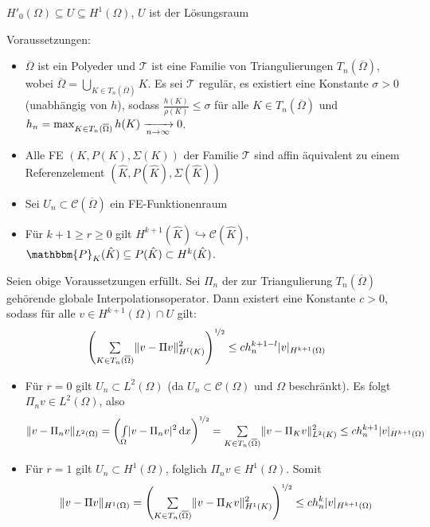 \documentclass{cheat-sheet}
\newcommand{\Cont}{\mathcal{C}} %
\newcommand{\clos}[1]{\overline{#1}} %
\newcommand{\cOmega}{\clos{\Omega}} %
\newcommand{\IntOmega}[2]{\AInt{\Omega}{#1}{#2}} %
\newcommand{\Poly}{\mathbbm{P}} %
\begin{document}

$H'_0(\Omega) \subseteq U \subseteq H^1(\Omega)$, $U$ ist der Lösungsraum

Voraussetzungen:

\begin{itemize}
  \item $\cOmega$ ist ein Polyeder und $\mathcal{T}$ ist eine Familie von Triangulierungen $T_n(\cOmega)$, wobei $\cOmega = \bigcup_{K \in T_n(\cOmega)} K$.
  Es sei $\mathcal{T}$ regulär, \dh{} es existiert eine Konstante $\sigma > 0$ (unabhängig von $h$), sodass $\tfrac{h(K)}{\rho(K)} \leq \sigma$ für alle $K \in T_n(\cOmega)$ und $h_n = \max_{K \in T_n(\cOmega)} h(K) \xra[n \to \infty]{} 0$.
  \item Alle FE $(K, P(K), \Sigma(K))$ der Familie $\mathcal{T}$ sind affin äquivalent zu einem Referenzelement $(\hat{K}, P(\hat{K}), \Sigma(\hat{K}))$
  \item Sei $U_n \subset \Cont(\cOmega)$ ein FE-Funktionenraum
  \item Für $k+1 \geq r \geq 0$  gilt $H^{k+1}(\hat{K}) \hookrightarrow \Cont(\hat{K})$, $\Poly_K(\hat{K}) \subseteq P(\hat{K}) \subset H^k(\hat{K})$.
\end{itemize}

\begin{satz}
  Seien obige Voraussetzungen erfüllt.
  Sei $\Pi_n$ der zur Triangulierung $T_n(\cOmega)$ gehörende globale Interpolationsoperator.
  Dann existert eine Konstante $c > 0$, sodass für alle $v \in H^{k+1}(\Omega) \cap U$ gilt:
  \[
    \left( \sum_{K \in T_n(\cOmega)} \norm{v - \Pi v}^2_{H^l(K)} \right)^{\nicefrac{1}{2}} \leq c h_n^{k+1-l} \abs{v}_{H^{k+1}(\Omega)}
  \]
\end{satz}

\begin{bemn}
  \begin{itemize}
    \item Für $r = 0$ gilt $U_n \subset L^2(\Omega)$ (da $U_n \subset \Cont(\Omega)$ und $\Omega$ beschränkt).
    Es folgt $\Pi_n v \in L^2(\Omega)$, also
    \[
      \norm{v - \Pi_n v}_{L^2(\Omega)} = \left( \IntOmega{\abs{v - \Pi_n v}^2}{x} \right)^{\nicefrac{1}{2}} = \sum_{K \in T_n(\cOmega)} \norm{v - \Pi_K v}^2_{L^2(K)} \leq c h_n^{k+1} \abs{v}_{H^{k+1}(\Omega)}
    \]
    \item Für $r = 1$ gilt $U_n \subset H^1(\Omega)$, folglich $\Pi_n v \in H^1(\Omega)$.
    Somit
    \[
      \norm{v - \Pi v}_{H^1(\Omega)} = \left( \sum_{K \in T_n(\cOmega)} \norm{v - \Pi_K v}^2_{H^1(K)} \right)^{\nicefrac{1}{2}} \leq c h_n^k \abs{v}_{H^{k+1}(\Omega)}
    \]
  \end{itemize}
\end{bemn}
\end{document}
